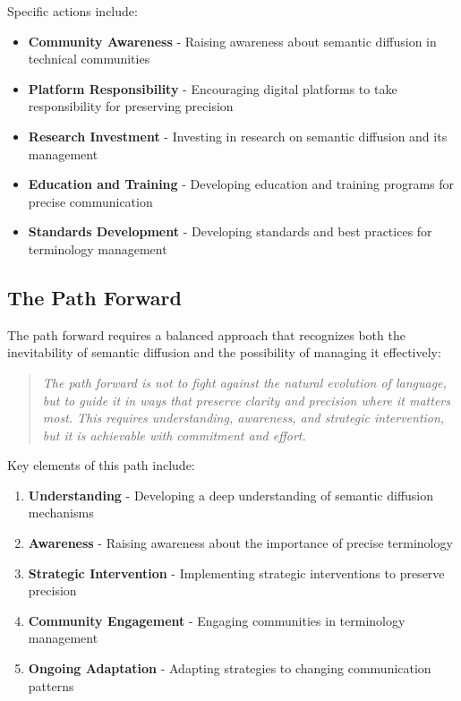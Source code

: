 \documentclass[11pt]{article}
\begin{document}
Specific actions include:

\begin{itemize}
\item \textbf{Community Awareness} - Raising awareness about semantic diffusion in technical communities
\item \textbf{Platform Responsibility} - Encouraging digital platforms to take responsibility for preserving precision
\item \textbf{Research Investment} - Investing in research on semantic diffusion and its management
\item \textbf{Education and Training} - Developing education and training programs for precise communication
\item \textbf{Standards Development} - Developing standards and best practices for terminology management
\end{itemize}

\subsection{The Path Forward}

The path forward requires a balanced approach that recognizes both the inevitability of semantic diffusion and the possibility of managing it effectively:

\begin{quote}
\emph{The path forward is not to fight against the natural evolution of language, but to guide it in ways that preserve clarity and precision where it matters most. This requires understanding, awareness, and strategic intervention, but it is achievable with commitment and effort.}
\end{quote}

Key elements of this path include:

\begin{enumerate}
\item \textbf{Understanding} - Developing a deep understanding of semantic diffusion mechanisms
\item \textbf{Awareness} - Raising awareness about the importance of precise terminology
\item \textbf{Strategic Intervention} - Implementing strategic interventions to preserve precision
\item \textbf{Community Engagement} - Engaging communities in terminology management
\item \textbf{Ongoing Adaptation} - Adapting strategies to changing communication patterns
\end{enumerate}
\end{document}
